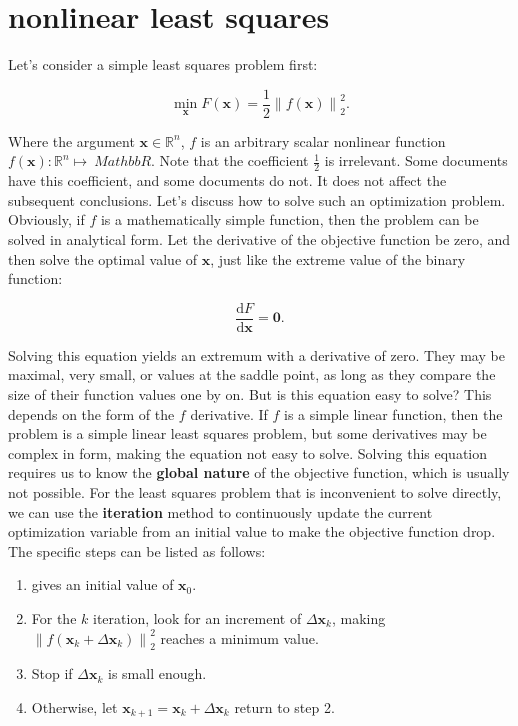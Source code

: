 \section{nonlinear least squares}

\label{sec:6.2}

Let's consider a simple least squares problem first:

\begin{equation}
\mathop {\min }\limits_{\bm{x}} F(\bm{x}) = \frac{1}{2}{\left\| {f\left( \bm{x} \right)} \right\|^2_2}.
\end{equation}

Where the argument $\bm{x} \in \mathbb{R}^n$, $f$ is an arbitrary scalar nonlinear function $f(\bm{x}): \mathbb{R}^n \mapsto \ Mathbb{R}$. Note that the coefficient $\frac{1}{2}$ is irrelevant. Some documents have this coefficient, and some documents do not. It does not affect the subsequent conclusions. Let's discuss how to solve such an optimization problem. Obviously, if $f$ is a mathematically simple function, then the problem can be solved in analytical form. Let the derivative of the objective function be zero, and then solve the optimal value of $\bm{x}$, just like the extreme value of the binary function:

\begin{equation}
\frac{ \mathrm{d} F}{ \mathrm{d} \bm{x} } = \bm{0}.
\end{equation}

Solving this equation yields an extremum with a derivative of zero. They may be maximal, very small, or values at the saddle point, as long as they compare the size of their function values one by on. But is this equation easy to solve? This depends on the form of the $f$ derivative. If $f$ is a simple linear function, then the problem is a simple linear least squares problem, but some derivatives may be complex in form, making the equation not easy to solve. Solving this equation requires us to know the \textbf{global nature} of the objective function, which is usually not possible. For the least squares problem that is inconvenient to solve directly, we can use the \textbf{iteration} method to continuously update the current optimization variable from an initial value to make the objective function drop. The specific steps can be listed as follows:

\begin{mdframed}  
	\begin{enumerate}
		\item gives an initial value of $\bm{x}_0$.
		\item For the $k$ iteration, look for an increment of $\Delta \bm{x}_k$, making $\left\| {f\left( \bm{x}_k + \Delta \bm{x} _k \right)} \right \|^2_2$ reaches a minimum value.
		\item Stop if $\Delta \bm{x}_k$ is small enough.
		\item Otherwise, let $\bm{x}_{k+1} = \bm{x}_k+\Delta \bm{x}_k$ return to step 2.
	\end{enumerate}
\end{mdframed}

